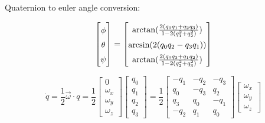 Quaternion to euler angle conversion:

\begin{equation*}
  \begin{bmatrix}
  \phi \\ \theta \\ \psi
  \end{bmatrix}
  =
  \renewcommand\arraystretch{1.5}
  \begin{bmatrix}
  \arctan(\frac{2(q_0q_1 + q_2q_3)}{1 - 2(q_1^2 + q_2^2)}) \\
  \arcsin(2(q_0q_2 - q_3q_1)) \\
  \arctan(\frac{2(q_0q_3 + q_1q_2)}{1 - 2(q_2^2 + q_3^2)}) \\
  \end{bmatrix}
\end{equation*}

\begin{equation*}
  \dot{q} = \frac{1}{2} \vec{\omega} \cdot q =
  \frac{1}{2}
  \begin{bmatrix}
  0 \\ \omega_x \\ \omega_y \\ \omega_z
  \end{bmatrix}
  \begin{bmatrix}
  q_0 \\ q_1 \\ q_2 \\ q_3
  \end{bmatrix} =
  \frac{1}{2}
  \begin{bmatrix}
  -q_1  & -q_2  & -q_3 \\
   q_0  & -q_3  &  q_2 \\
   q_3  &  q_0  & -q_1 \\
  -q_2  &  q_1  & q_0
  \end{bmatrix}
  \begin{bmatrix}
  \omega_x \\ \omega_y \\ \omega_z
  \end{bmatrix}
\end{equation*}
